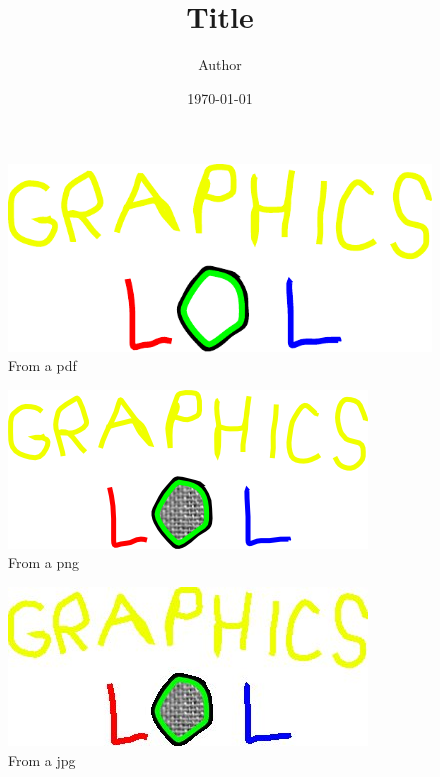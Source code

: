 \documentclass[10pt]{article}
\title{Title}
\author{Author}
\date{\today}
\begin{document}
\maketitle

\begin{figure}
  \centering
  \includegraphics[width=0.7\linewidth]{graphics-pdf}
  \caption{From a pdf}
  \label{fig:graphics-pdf}
\end{figure}

\begin{figure}
  \centering
  \includegraphics[width=0.7\linewidth]{graphics-png}
  \caption{From a png}
  \label{fig:graphics-png}
\end{figure}

\begin{figure}
  \centering
  \includegraphics[width=0.7\linewidth]{graphics-jpg}
  \caption{From a jpg}
  \label{fig:graphics-jpg}
\end{figure}
\end{document}
